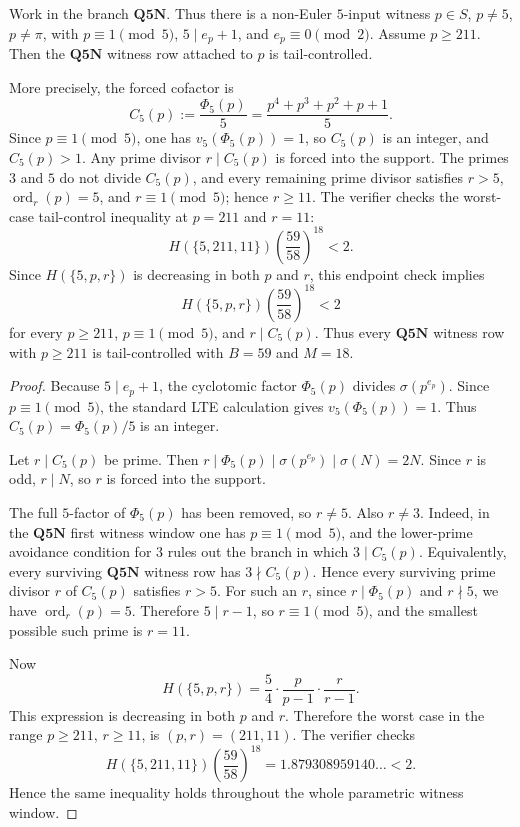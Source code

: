 \begin{criterion}
\label{crit:q5n-parametric-witness-window-closure}
Work in the branch \(\mathbf{Q5N}\).  Thus there is a non-Euler \(5\)-input
witness \(p\in S\), \(p\ne5\), \(p\ne\pi\), with \(p\equiv1\pmod5\),
\(5\mid e_p+1\), and \(e_p\equiv0\pmod2\).  Assume \(p\ge211\).  Then the
\(\mathbf{Q5N}\) witness row attached to \(p\) is tail-controlled.

More precisely, the forced cofactor is
\[
  C_5(p)
  :=
  \frac{\Phi_5(p)}5
  =
  \frac{p^4+p^3+p^2+p+1}{5}.
\]
Since \(p\equiv1\pmod5\), one has \(v_5(\Phi_5(p))=1\), so \(C_5(p)\) is an
integer, and \(C_5(p)>1\).  Any prime divisor \(r\mid C_5(p)\) is forced into
the support.  The primes \(3\) and \(5\) do not divide
\(C_5(p)\), and every remaining prime divisor satisfies
\(r>5\), \(\operatorname{ord}_r(p)=5\), and \(r\equiv1\pmod5\); hence
\(r\ge11\).  The verifier checks the worst-case tail-control inequality at
\(p=211\) and \(r=11\):
\[
  H(\{5,211,11\})
  \left(\frac{59}{58}\right)^{18}
  <2.
\]
Since \(H(\{5,p,r\})\) is decreasing in both \(p\) and \(r\), this endpoint
check implies
\[
  H(\{5,p,r\})
  \left(\frac{59}{58}\right)^{18}
  <2
\]
for every \(p\ge211\), \(p\equiv1\pmod5\), and \(r\mid C_5(p)\).  Thus every
\(\mathbf{Q5N}\) witness row with \(p\ge211\) is tail-controlled with \(B=59\)
and \(M=18\).
\end{criterion}

\begin{proof}
Because \(5\mid e_p+1\), the cyclotomic factor \(\Phi_5(p)\) divides
\(\sigma(p^{e_p})\).  Since \(p\equiv1\pmod5\), the standard LTE calculation
gives \(v_5(\Phi_5(p))=1\).  Thus \(C_5(p)=\Phi_5(p)/5\) is an integer.

Let \(r\mid C_5(p)\) be prime.  Then
\(r\mid\Phi_5(p)\mid\sigma(p^{e_p})\mid\sigma(N)=2N\).  Since \(r\) is odd,
\(r\mid N\), so \(r\) is forced into the support.

The full \(5\)-factor of \(\Phi_5(p)\) has been removed, so
\(r\ne5\).  Also \(r\ne3\).  Indeed, in the \(\mathbf{Q5N}\) first witness window one has
\(p\equiv1\pmod5\), and the lower-prime avoidance condition for \(3\) rules out
the branch in which \(3\mid C_5(p)\).  Equivalently, every surviving
\(\mathbf{Q5N}\) witness row has \(3\nmid C_5(p)\).  Hence every surviving
prime divisor \(r\) of \(C_5(p)\) satisfies \(r>5\).  For such an \(r\), since
\(r\mid\Phi_5(p)\) and \(r\nmid5\), we have \(\operatorname{ord}_r(p)=5\).
Therefore \(5\mid r-1\), so \(r\equiv1\pmod5\), and the smallest possible such
prime is \(r=11\).

Now
\[
  H(\{5,p,r\})
  =
  \frac54\cdot\frac{p}{p-1}\cdot\frac{r}{r-1}.
\]
This expression is decreasing in both \(p\) and \(r\).  Therefore the worst case
in the range \(p\ge211\), \(r\ge11\), is \((p,r)=(211,11)\).
The verifier checks
\[
  H(\{5,211,11\})
  \left(\frac{59}{58}\right)^{18}
  =
  1.879308959140\ldots
  <2.
\]
Hence the same inequality holds throughout the whole parametric witness window.
\end{proof}

